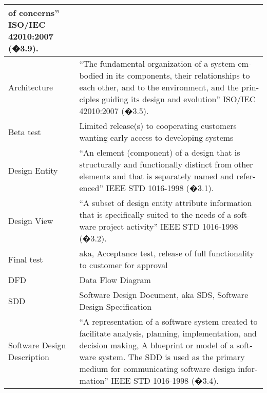 \documentclass[twoside,letterpaper]{article}
\begin{document}
\begin{flushleft}
\begin{supertabular}{|m{1.3587599in}|m{5.00806in}|}
{of concerns{\textquotedblright} ISO/IEC 42010:2007 (�3.9).}\\\hline
{}\color{black} Architecture &
\color{black}
\foreignlanguage{english}{{\textquotedblleft}}\foreignlanguage{english}{The
fundamental organization of a system embodied in its components, their
relationships to each other, and to the environment, and the principles
guiding its design and evolution{\textquotedblright} ISO/IEC 42010:2007
(�3.5).}\\\hline
{}\color{black} Beta test &
\color{black} Limited release(s) to cooperating
customers wanting early access to developing systems\\\hline
{}\color{black} Design Entity &
\color{black}
\foreignlanguage{english}{{\textquotedblleft}}\foreignlanguage{english}{An
element (component) of a design that is structurally and functionally
distinct from other elements and that is separately named and
referenced{\textquotedblright} IEEE STD 1016-1998 (�3.1).}\\\hline
{}\color{black} Design View &
\color{black}
\foreignlanguage{english}{{\textquotedblleft}}\foreignlanguage{english}{A
subset of design entity attribute information that is specifically
suited to the needs of a software project activity{\textquotedblright}
IEEE STD 1016-1998 (�3.2).}\\\hline
{}\color{black} Final test &
\color{black} aka, Acceptance test, release of
full functionality to customer for approval\\\hline
{}\color{black} DFD &
\color{black} Data Flow Diagram\\\hline
{}\color{black} SDD &
\color{black} Software Design Document, aka SDS,
Software Design Specification\\\hline
{}\color{black} Software Design Description &
\color{black}
\foreignlanguage{english}{{\textquotedblleft}}\foreignlanguage{english}{A
representation of a software system created to facilitate analysis,
planning, implementation, and decision making, A blueprint or model of
a software system. The SDD is used as the primary medium for
communicating software }\foreignlanguage{english}{design
information{\textquotedblright} IEEE STD 1016-1998 (�3.4).}\\\hline

\end{supertabular}
\end{flushleft}
\end{document}
